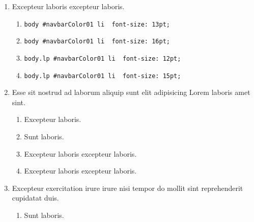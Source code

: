 \documentclass[a4paper,12pt]{article}
\begin{document}
\begin{enumerate}[label=\textbf{\arabic*.}]
\begin{multicols}{2}
\begin{enumerate}
		\item  Excepteur laboris excepteur laboris.
    
		\item  Excepteur laboris excepteur laboris.
  
		\item  Sunt laboris.
    
	\end{enumerate}

\end{multicols}
\item Excepteur laboris excepteur laboris.
	\begin{enumerate}
		\item  \texttt{body \#navbarColor01 li { font-size: 13pt; }}
    
		\item  \texttt{body \#navbarColor01 li { font-size: 16pt; }}
  
		\item  \texttt{body.lp \#navbarColor01 li { font-size: 12pt; }}
    
		\item  \texttt{body.lp \#navbarColor01 li { font-size: 15pt; }}
    
	\end{enumerate}

\item Esse sit nostrud ad laborum aliquip sunt elit adipisicing Lorem laboris amet sint.
\begin{multicols}{2}
	\begin{enumerate}
		\item  Excepteur laboris.
    
		\item  Sunt laboris.
    
		\item  Excepteur laboris excepteur laboris.
  
		\item  Excepteur laboris excepteur laboris.
    
	\end{enumerate}

\end{multicols}
\item Excepteur exercitation irure irure nisi tempor do mollit sint reprehenderit cupidatat duis.
\begin{multicols}{2}
	\begin{enumerate}
		\item  Sunt laboris.
    

\end{enumerate}
\end{multicols}
\end{enumerate}
\end{document}
